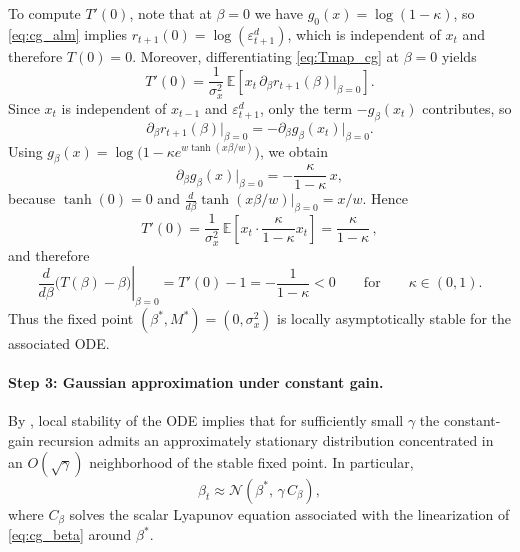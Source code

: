 \documentclass[11pt]{article}
\begin{document}
To compute $T'(0)$, note that at $\beta=0$ we have $g_0(x)=\log(1-\kappa)$, so \eqref{eq:cg_alm} implies $r_{t+1}(0)=\log(\varepsilon^d_{t+1})$, which is independent of $x_t$ and therefore $T(0)=0$.
Moreover, differentiating \eqref{eq:Tmap_cg} at $\beta=0$ yields
\begin{equation}
    T'(0)=\frac{1}{\sigma_x^2}\,\mathbb E\!\left[x_t\,\partial_\beta r_{t+1}(\beta)\big|_{\beta=0}\right].
\end{equation}
Since $x_t$ is independent of $x_{t-1}$ and $\varepsilon^d_{t+1}$, only the term $-g_\beta(x_t)$ contributes, so
\[
\partial_\beta r_{t+1}(\beta)\big|_{\beta=0}=-\partial_\beta g_\beta(x_t)\big|_{\beta=0}.
\]
Using $g_\beta(x)=\log\!\big(1-\kappa e^{w\tanh(x\beta/w)}\big)$, we obtain
\[
\partial_\beta g_\beta(x)\big|_{\beta=0}
=
-\frac{\kappa}{1-\kappa}\,x,
\]
because $\tanh(0)=0$ and $\frac{d}{d\beta}\tanh(x\beta/w)\big|_{\beta=0}=x/w$.
Hence
\begin{equation}\label{eq:Tprime0_cg}
    T'(0)=\frac{1}{\sigma_x^2}\,\mathbb E\!\left[x_t\cdot\frac{\kappa}{1-\kappa}x_t\right]
    =\frac{\kappa}{1-\kappa}\,,
\end{equation}
and therefore
\[
\left.\frac{d}{d\beta}\big(T(\beta)-\beta\big)\right|_{\beta=0}
=T'(0)-1=-\frac{1}{1-\kappa}<0
\qquad\text{for}\qquad \kappa\in(0,1).
\]
Thus the fixed point $(\beta^*,M^*)=(0,\sigma_x^2)$ is locally asymptotically stable for the associated ODE.

\paragraph{Step 3: Gaussian approximation under constant gain.}
By \citet[Thm.~7.9]{GeorgeWEvans2001}, local stability of the ODE implies that for sufficiently small $\gamma$ the constant-gain recursion admits an approximately stationary distribution concentrated in an $O(\sqrt{\gamma})$ neighborhood of the stable fixed point. In particular,
\begin{equation}\label{eq:cg_gaussian}
    \beta_t \approx \mathcal N\!\left(\beta^*,\,\gamma\,C_\beta\right),
\end{equation}
where $C_\beta$ solves the scalar Lyapunov equation associated with the linearization of \eqref{eq:cg_beta} around $\beta^*$.
\end{document}
